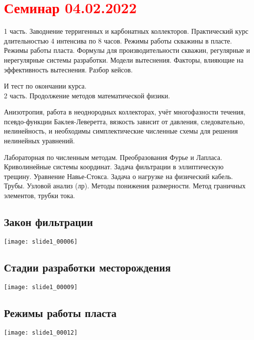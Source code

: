 \documentclass[main.tex]{subfiles}
\begin{document}
\section{\textcolor{red}{Семинар 04.02.2022}}

1 часть. Заводнение терригенных и карбонатных коллекторов. Практический курс длительностью 4 интенсива по 8 часов. Режимы работы скважины в пласте. Режимы работы пласта. Формулы для производительности скважин, регулярные и нерегулярные системы разработки. Модели вытеснения. Факторы, влияющие на эффективность вытеснения. Разбор кейсов.

И тест по окончании курса.\\

2 часть. Продолжение методов математической физики.

Анизотропия, работа в неоднородных коллекторах, учёт многофазности течения, псевдо-функции Баклея-Леверетта, вязкость зависит от давления, следовательно, нелинейность, и необходимы симплектические численные схемы для решения нелинейных уравнений.

Лабораторная по численным методам. Преобразования Фурье и Лапласа. Криволинейные системы координат. Задача фильтрации в эллиптическую трещину. Уравнение Навье-Стокса. Задача о нагрузке на физический кабель. Трубы. Узловой анализ (лр). Методы понижения размерности. Метод граничных элементов, трубки тока.



\subsection{Закон фильтрации}
\texttt{[image: slide1\_00006]}


\subsection{Стадии разработки месторождения}
\texttt{[image: slide1\_00009]}



\subsection{Режимы работы пласта}
\texttt{[image: slide1\_00012]}
\end{document}
